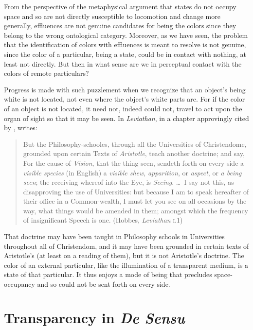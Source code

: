 From the perspective of the metaphysical argument that states do not occupy space and so are not directly susceptible to locomotion and change more generally, effluences are not genuine candidates for being the colors since they belong to the wrong ontological category. Moreover, as we have seen, the problem that the identification of colors with effluences is meant to resolve is not genuine, since the color of a particular, being a state, could be in contact with nothing, at least not directly. But then in what sense are we in perceptual contact with the colors of remote particulars? 

Progress is made with such puzzlement when we recognize that an object's being white is not located, not even where the object's white parts are. For if the color of an object is not located, it need not, indeed could not, travel to act upon the organ of sight so that it may be seen. In \emph{Leviathan}, in a chapter approvingly cited by \citet[26 n7]{Burnyeat:1992fk}, \citet{Hobbes:1651fk} writes:
\begin{quote}
	But the Philosophy-schooles, through all the Universities of Christendome, grounded upon certain Texts of \emph{Aristotle}, teach another doctrine; and say, For the cause of \emph{Vision}, that the thing seen, sendeth forth on every side a \emph{visible species} (in English) a \emph{visible shew}, \emph{apparition}, or \emph{aspect}, or \emph{a being seen}; the receiving whereof into the Eye, is \emph{Seeing}. \ldots\ I say not this, as disapproving the use of Universities: but because I am to speak hereafter of their office in a Common-wealth, I must let you see on all occasions by the way, what things would be amended in them; amongst which the frequency of insignificant Speech is one. (Hobbes, \emph{Leviathan} \textsc{i}.1)
\end{quote}
That doctrine may have been taught in Philosophy schools in Universities throughout all of Christendom, and it may have been grounded in certain texts of Aristotle's (at least on a reading of them), but it is not Aristotle's doctrine. The color of an external particular, like the illumination of a transparent medium, is a state of that particular. It thus enjoys a mode of being that precludes space-occupancy and so could not be sent forth on every side.


\section{Transparency in \emph{De Sensu}} %
\label{sec:transparency_in_de_sensu}

